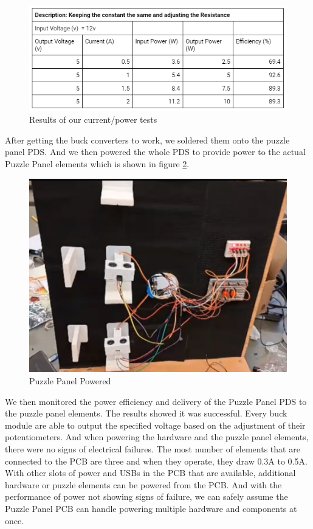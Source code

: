 \documentclass[a4paper, 10pt]{article}
\begin{document}

\begin{figure} [!h]
			\centering
			\includegraphics[scale=0.9]{Photos/Buck Converter Data}
			\caption{Results of our current/power tests}
			\label{Buck Converted Data}
		\end{figure}

	After getting the buck converters to work, we soldered them onto the puzzle panel PDS. And we then powered the whole PDS to provide power to the actual Puzzle Panel elements which is shown in figure \ref{PuzzlePanelPowered}. 


\begin{figure} [!h]
			\centering
			\includegraphics[scale=0.9]{Photos/Puzzle Panel Powered}
			\caption{Puzzle Panel Powered}
			\label{PuzzlePanelPowered}
		\end{figure}

	We then monitored the power efficiency and delivery of the Puzzle Panel PDS to the puzzle panel elements. The results showed it was successful. Every buck module are able to output the specified voltage based on the adjustment of their potentiometers. And when powering the hardware and the puzzle panel elements, there were no signs of electrical failures. The most number of elements that are connected to the PCB are three and when they operate, they draw 0.3A to 0.5A. With other slots of power and USBs in the PCB that are available, additional hardware or puzzle elements can be powered from the PCB. And with the performance of power not showing signs of failure, we can safely assume the Puzzle Panel PCB can handle powering multiple hardware and components at once.
\end{document}
